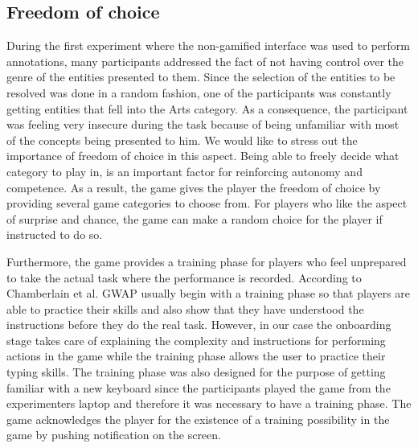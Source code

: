 \subsection{Freedom of choice}
During the first experiment where the non-gamified interface was used to perform annotations, many participants addressed the fact of not having control over the genre of the entities presented to them. Since the selection of the entities to be resolved was done in a random fashion, one of the participants was constantly getting entities that fell into the Arts category. As a consequence, the participant was feeling very insecure during the task because of being unfamiliar with most of the concepts being presented to him. We would like to stress out the importance of freedom of choice in this aspect. Being able to freely decide what category to play in, is an important factor for reinforcing autonomy and competence. As a result, the game gives the player the freedom of choice by providing several game categories to choose from. For players who like the aspect of surprise and chance, the game can make a random choice for the player if instructed to do so. 

Furthermore, the game provides a training phase for players who feel unprepared to take the actual task where the performance is recorded. According to Chamberlain et al. \cite{43} GWAP usually begin with a training phase so that players are able to practice their skills and also show that they have understood the instructions before they do the real task. However, in our case the onboarding stage takes care of explaining the complexity and instructions for performing actions in the game while the training phase allows the user to practice their typing skills. The training phase was also designed for the purpose of getting familiar with a new keyboard since the participants played the game from the experimenters laptop and therefore it was necessary to have a training phase. The game acknowledges the player for the existence of a training possibility in the game by pushing notification on the screen.